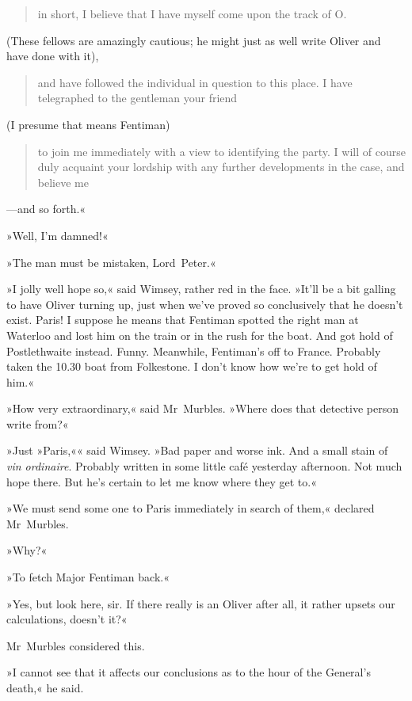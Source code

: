 \begin{quotation}
in short, I believe that I have myself come upon the track of O\@.
\end{quotation} 

(These fellows are amazingly cautious; he might just as well write Oliver and have done with it), 

\begin{quotation}
and have followed the individual in question to this place. I have telegraphed to the gentleman your friend
\end{quotation} 

(I presume that means Fentiman) 

\begin{quotation}to join me immediately with a view to identifying the party. I will of course duly acquaint your lordship with any further developments in the case, and believe me\end{quotation}—and so forth.«

»Well, I'm damned!«

»The man must be mistaken, Lord~Peter.«

»I jolly well hope so,« said Wimsey, rather red in the face. »It'll be a bit galling to have Oliver turning up, just when we've proved so conclusively that he doesn't exist. Paris! I suppose he means that Fentiman spotted the right man at Waterloo and lost him on the train or in the rush for the boat. And got hold of Postlethwaite instead. Funny. Meanwhile, Fentiman's off to France. Probably taken the 10.30 boat from Folkestone. I don't know how we're to get hold of him.«

»How very extraordinary,« said Mr~Murbles. »Where does that detective person write from?«

»Just »Paris,«« said Wimsey. »Bad paper and worse ink. And a small stain of \textit{vin ordinaire}. Probably written in some little café yesterday afternoon. Not much hope there. But he's certain to let me know where they get to.«

»We must send some one to Paris immediately in search of them,« declared Mr~Murbles.

»Why?«

»To fetch Major Fentiman back.«

»Yes, but look here, sir. If there really is an Oliver after all, it rather upsets our calculations, doesn't it?«

Mr~Murbles considered this.

»I cannot see that it affects our conclusions as to the hour of the General's death,« he said.

